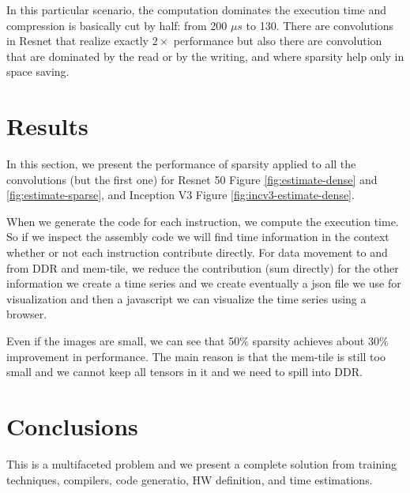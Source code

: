 \documentclass[conference]{IEEEtran}
\begin{document}
In this particular scenario, the computation dominates the execution
time and compression is basically cut by half: from 200 $\mu s$ to
130. There are convolutions in Resnet that realize exactly $2\times$
performance but also there are convolution that are dominated by the
read or by the writing, and where sparsity help only in space saving.

\section{Results}
\label{sec:experiments}
In this section, we present the performance of sparsity applied to all
the convolutions (but the first one) for Resnet 50 Figure
\ref{fig:estimate-dense} and \ref{fig:estimate-sparse}, and Inception
V3 Figure \ref{fig:incv3-estimate-dense}.

When we generate the code for each instruction, we compute the
execution time. So if we inspect the assembly code we will find time
information in the context whether or not each instruction contribute
directly. For data movement to and from DDR and mem-tile, we reduce
the contribution (sum directly) for the other information we create a
time series and we create eventually a json file we use for
visualization and then a javascript we can visualize the time series
using a browser.

Even if the images are small, we can see that 50\% sparsity achieves
about 30\% improvement in performance. The main reason is that the
mem-tile is still too small and we cannot keep all tensors in it and
we need to spill into DDR.










\section{Conclusions}
This is a multifaceted problem and we present a complete solution from
training techniques, compilers, code generatio, HW definition, and
time estimations.


 

%
\end{document}
